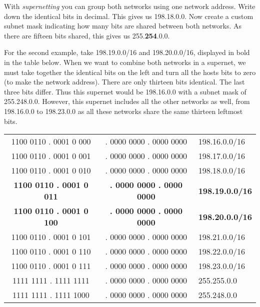 {With \emph{supernetting} you can group both networks using one network address.
Write down the identical bits in decimal.
This gives us 198.18.0.0.
Now create a custom subnet mask indicating how many bits are shared between both networks.
As there are fifteen bits shared, this gives us 255.\textbf{254}.0.0.

For the second example, take 198.19.0.0/16 and 198.20.0.0/16, displayed in bold in the table below.
When we want to combine both networks in a supernet, we must take together the identical bits on the left and turn all the hosts bits to zero (to make the network address).
There are only thirteen bits identical. The last three bits differ.
Thus this supernet would be 198.16.0.0 with a subnet mask of 255.248.0.0.
However, this supernet includes all the other networks as well, from 198.16.0.0 to 198.23.0.0 as all these networks share the same thirteen leftmost bits.


\begin{center}
\begin{tabular}{c|cl}
\color{spot1} 1100 0110 . 0001 0\color{spot2} 000 & . 0000 0000 . 0000 0000 & 198.16.0.0/16 \\
\color{spot1} 1100 0110 . 0001 0\color{spot2} 001 & . 0000 0000 . 0000 0000 & 198.17.0.0/16 \\
\color{spot1} 1100 0110 . 0001 0\color{spot2} 010 & . 0000 0000 . 0000 0000 & 198.18.0.0/16 \\
\bfseries\color{spot1} 1100 0110 . 0001 0\bfseries\color{spot2} 011 & \bfseries . 0000 0000 . 0000 0000 & \bfseries198.19.0.0/16 \\
\bfseries\color{spot1} 1100 0110 . 0001 0\bfseries\color{spot2} 100 & \bfseries . 0000 0000 . 0000 0000 & \bfseries 198.20.0.0/16 \\
\color{spot1} 1100 0110 . 0001 0\color{spot2} 101 & . 0000 0000 . 0000 0000 & 198.21.0.0/16 \\
\color{spot1} 1100 0110 . 0001 0\color{spot2} 110 & . 0000 0000 . 0000 0000 & 198.22.0.0/16 \\
\color{spot1} 1100 0110 . 0001 0\color{spot2} 111 & . 0000 0000 . 0000 0000 & 198.23.0.0/16 \\
\hline
1111 1111 . 1111 1111 & . 0000 0000 . 0000 0000 & 255.255.0.0 \\
1111 1111 . 1111 1000 & . 0000 0000 . 0000 0000 & 255.248.0.0 \\
\end{tabular}
\end{center}
}

